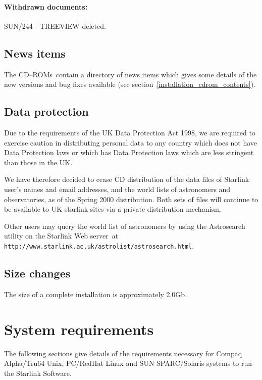 \documentclass[twoside,11pt]{article}
\newcommand{\htmladdnormallink}[2]{#1}
\newcommand{\latex}[1]{#1}
\newcommand{\xlabel}[1]{}
\renewcommand{\_}{\texttt{\symbol{95}}}
\newcommand{\cdroms}{CD--ROMs}
\newcommand{\cdroms}{CD-ROMs}
\begin{document}
\paragraph{Withdrawn documents:}

SUN/244 - TREEVIEW deleted.

\subsection{News items}

The \cdroms\ contain a directory of news items which gives some
details of the new versions and bug fixes available (see
section~\ref{installation_cdrom_contents}).

\subsection{\xlabel{data_protection}Data protection}
\label{data_protection}

Due to the requirements of the UK Data Protection Act 1998, we are
required to exercise caution in distributing personal data to any country
which does not have Data Protection laws or which has Data Protection
laws which are less stringent than those in the UK.

We have therefore decided to cease CD distribution of the data files
of Starlink user's names and email addresses, and the world lists of
astronomers and observatories, as of the Spring 2000 distribution.
Both sets of files will continue to be available to UK starlink sites
via a private distribution mechanism.

Other users may query the world list of astronomers by using the
\htmladdnormallink{Astrosearch}{http://www.starlink.ac.uk/astrolist/astrosearch.html} 
utility on the Starlink Web server\latex{~at 
\texttt{http://www.starlink.ac.uk/astrolist/astrosearch.html}}.

\subsection{Size changes}

The size of a complete installation is approximately 2.0Gb.

\newpage
\section{\xlabel{system_requirements}System requirements}
\label{system_requirements}

The following sections give details of the requirements necessary for
Compaq Alpha/Tru64 Unix, PC/RedHat Linux and SUN SPARC/Solaris
systems to run the Starlink Software.
\end{document}
